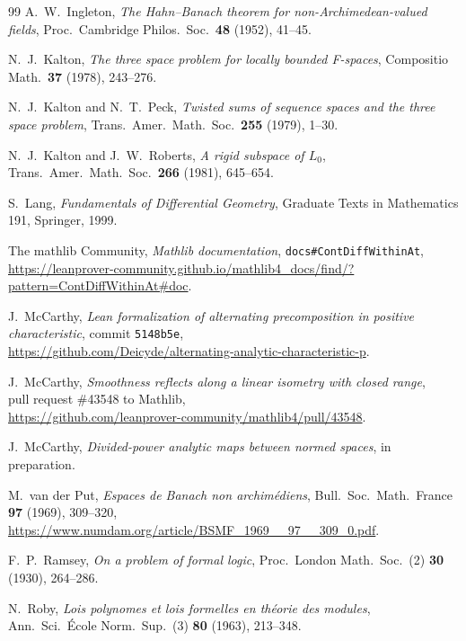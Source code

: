 \documentclass[11pt]{amsart}
\theoremstyle{definition}
\theoremstyle{remark}
\numberwithin{equation}{section}
\theoremstyle{plain}
\theoremstyle{definition}
\theoremstyle{plain}
\begin{document}
\begin{thebibliography}{99}
 A.~W.~Ingleton, \emph{The Hahn--Banach theorem for non-Archimedean-valued fields}, Proc.\ Cambridge Philos.\
Soc.\ \textbf{48} (1952), 41--45.

 N.~J.~Kalton, \emph{The three space problem for locally bounded F-spaces}, Compositio Math.\ \textbf{37}
(1978), 243--276.

 N.~J.~Kalton and N.~T.~Peck, \emph{Twisted sums of sequence spaces and the three space problem}, Trans.\
Amer.\ Math.\ Soc.\ \textbf{255} (1979), 1--30.

 N.~J.~Kalton and J.~W.~Roberts, \emph{A rigid subspace of $L_0$}, Trans.\ Amer.\ Math.\ Soc.\ \textbf{266}
(1981), 645--654.

 S.~Lang, \emph{Fundamentals of Differential Geometry}, Graduate Texts in Mathematics 191, Springer, 1999.

\bibitem{docs} The mathlib Community, \emph{Mathlib documentation}, \texttt{docs\#ContDiffWithinAt},\\
{\footnotesize\url{https://leanprover-community.github.io/mathlib4_docs/find/?pattern=ContDiffWithinAt#doc}}.

\bibitem{LeanP} J.~McCarthy, \emph{Lean formalization of alternating precomposition in positive characteristic},
commit \texttt{5148b5e},\\
{\small\url{https://github.com/Deicyde/alternating-analytic-characteristic-p}}.

\bibitem{PR} J.~McCarthy, \emph{Smoothness reflects along a linear isometry with closed range},\\ pull request \#43548
to Mathlib,\\ {\small\url{https://github.com/leanprover-community/mathlib4/pull/43548}}.

\bibitem[II]{II} J.~McCarthy, \emph{Divided-power analytic maps between normed spaces}, in preparation.

\bibitem{VdP} M.~van der Put, \emph{Espaces de Banach non archim\'ediens}, Bull.\ Soc.\ Math.\ France
\textbf{97} (1969), 309--320,\\
{\small\url{https://www.numdam.org/article/BSMF_1969__97__309_0.pdf}}.

\bibitem{Ra} F.~P.~Ramsey, \emph{On a problem of formal logic}, Proc.\ London Math.\ Soc.\ (2) \textbf{30} (1930), 264--286.

\bibitem{Ro} N.~Roby, \emph{Lois polynomes et lois formelles en th\'eorie des modules}, Ann.\ Sci.\ \'Ecole Norm.\
Sup.\ (3) \textbf{80} (1963), 213--348.


\end{thebibliography}
\end{document}
